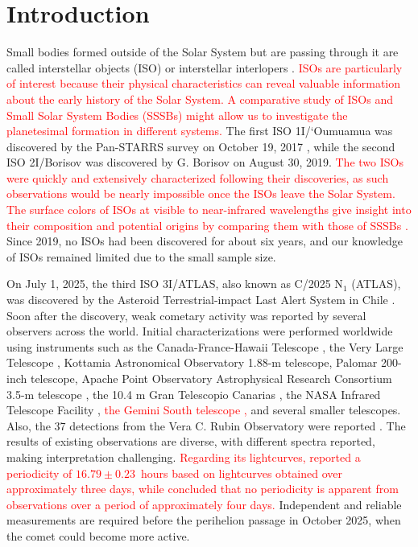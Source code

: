 \documentclass[]{pasj02}
\newcommand{\RED}[1]{\textcolor{red}{#1}}
\begin{document}
\section{Introduction}
Small bodies formed outside of the Solar System but are passing through it are called interstellar objects (ISO) or interstellar interlopers \citep[e.g.,][for review]{Jewitt2023}.
\RED{
    ISOs are particularly of interest 
    because their physical characteristics can reveal valuable information about the early history of the Solar System.
    A comparative study of ISOs and Small Solar System Bodies (SSSBs) might allow us to investigate the planetesimal formation in different systems.
    }
The first ISO 1I/`Oumuamua was discovered by the Pan-STARRS survey \citep{Chambers2016} on October 19, 2017 \citep{Meech2017}, while the second ISO 2I/Borisov was discovered by G. Borisov on August 30, 2019.
\RED{
    The two ISOs were quickly and extensively characterized following their discoveries,
    as such observations would be nearly impossible once the ISOs leave the Solar System.
    The surface colors of ISOs at visible to near-infrared wavelengths give insight into their composition and potential origins by comparing them with those of SSSBs
    \citep[e.g.,][]{Meech2017, Ye2017_1I, Jewitt2017, Bannister2017, Bolin2018_1I, Fitzsimmons2018, Jewitt2019_2I, Guzik2020_2I, Bolin2020_2I}.
}
Since 2019, no ISOs had been discovered for about six years, and our knowledge of ISOs remained limited due to the small sample size.

On July 1, 2025, the third ISO 3I/ATLAS, also known as C/2025 N$_1$ (ATLAS), was discovered by the Asteroid Terrestrial-impact Last Alert System \citep[ATLAS,][]{Tonry2018} in Chile \citep{Denneau2025}.
Soon after the discovery, weak cometary activity was reported by several observers across the world.
Initial characterizations were performed worldwide using instruments such as the Canada-France-Hawaii Telescope  \citep{Seligman2025_3I}, the Very Large Telescope \citep{Seligman2025_3I, Opitom2025_3I, Alvarez-Candal2025_3I}, 
Kottamia Astronomical Observatory 1.88-m telescope, Palomar 200-inch telescope, Apache Point Observatory Astrophysical Research Consortium 3.5-m telescope \citep{Bolin2025_3I, Belyakov2025_3I}, the 10.4 m Gran Telescopio Canarias \citep{Marcos2025_3I}, the NASA Infrared Telescope Facility \citep[IRTF,][]{Kareta2025_3I, Yang2025_3I}, 
\RED{
    the Gemini South telescope \citep{Yang2025_3I},
    }
and several smaller telescopes.
Also, the 37 detections from the Vera C. Rubin Observatory were reported \citep{Chandler2025_3I}.
The results of existing observations are diverse, with different spectra reported, making interpretation challenging.
\RED{
    Regarding its lightcurves, \citet{Marcos2025_3I} reported 
    a periodicity of $16.79\pm0.23$~hours based on lightcurves obtained over approximately three days, 
    while \citet{Seligman2025_3I} concluded that no periodicity is apparent from observations over a period of approximately four days.
    }
Independent and reliable measurements are required before the perihelion passage in October 2025, when the comet could become more active.
\end{document}
